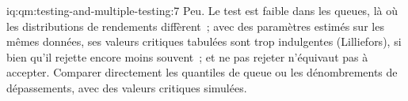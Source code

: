 \begin{solution}{iq:qm:testing-and-multiple-testing:7}
Peu. Le test est faible dans les queues, là où les distributions de rendements diffèrent~; avec des paramètres estimés sur les mêmes données, ses
valeurs critiques tabulées sont trop indulgentes (Lilliefors), si bien qu'il rejette encore moins souvent~; et ne pas rejeter n'équivaut pas à accepter. Comparer
directement les quantiles de queue ou les dénombrements de dépassements, avec des valeurs critiques simulées.
\end{solution}
